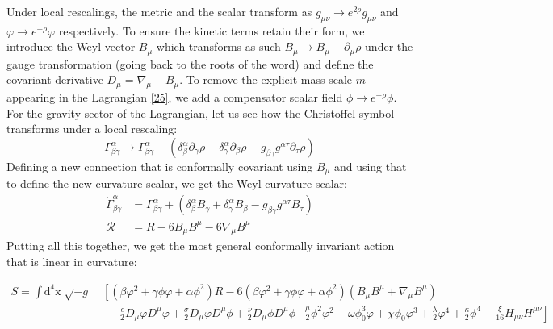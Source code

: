 \documentclass[aps,prd,reprint,preprintnumbers,showpacs,floatfix,nofootinbib,superscript address]{revtex4-2}
\begin{document}
Under local rescalings, the metric and the scalar transform as $g_{\mu\nu} \rightarrow e^{2\rho} g_{\mu\nu} $ and  $\varphi \rightarrow e^{-\rho}\varphi$ respectively. To ensure the kinetic terms retain their form, we introduce the Weyl vector $B_\mu$ which transforms as such $B_{\mu} \rightarrow B_\mu - \partial_\mu \rho$ under the gauge transformation (going back to the roots of the word) and define the covariant derivative $D_\mu = \nabla_\mu - B_\mu$. To remove the explicit mass scale $m$ appearing in the Lagrangian \ref{25}, we add a compensator scalar field $\phi \rightarrow e^{-\rho}\phi$. For the gravity sector of the Lagrangian, let us see how the Christoffel symbol transforms under a local rescaling:
\begin{equation}
    \Gamma^{\alpha}_{\beta \gamma} \rightarrow \Gamma^{\alpha}_{\beta \gamma} +(\delta^{\alpha}_{\beta} \partial_\gamma \rho + \delta^{\alpha}_{\gamma} \partial_{\beta} \rho - g_{\beta \gamma}g^{\alpha \tau}\partial_{\tau}\rho)
\end{equation}
Defining a new connection that is conformally covariant using $B_\mu$ and using that to define the new curvature scalar, we get the Weyl curvature scalar:
\begin{align}
    \mathring{\Gamma}^{\alpha}_{\beta \gamma} &= \Gamma^{\alpha}_{\beta \gamma} + (\delta^{\alpha}_{\beta} B_{\gamma} + \delta^{\alpha}_{\gamma} B_{\beta} - g_{\beta \gamma}g^{\alpha \tau}B_{\tau}) \nonumber \\
    \mathcal{R} &= R - 6 B_{\mu} B^{\mu} - 6 \nabla_\mu B^\mu
\end{align}
Putting all this together, we get the most general conformally invariant action that is linear in curvature:
\begin{widetext} 
\begin{subequations} \label{Starting Action}
\begin{align}
    S =\int \text{d}^4\text{x} \; \sqrt{-g} &\; \left[ ( \beta \varphi^2 + \gamma \phi \varphi +\alpha \phi^2) R - 6( \beta \varphi^2 + \gamma \phi \varphi +\alpha \phi^2) (B_{\mu} B^{\mu} + \nabla_\mu B^\mu) \right. \nonumber \\
    &\quad \left. +\frac{\epsilon}{2} D_{\mu}\varphi D^{\mu}\varphi + \frac{\sigma}{2} D_{\mu}\varphi D^{\mu}\phi + \frac{\nu}{2} D_{\mu}\phi D^{\mu}\phi \right. \left. - \frac{\mu}{2} \phi^2 \varphi^2 + \omega \phi_0^3 \varphi + \chi \phi_0 \varphi^3 + \frac{\lambda}{2} \varphi^4 + \frac{\kappa}{2} \phi^4 - \frac{\xi}{16} H_{\mu\nu}H^{\mu\nu} \right]  
\end{align}
\end{subequations}
\end{widetext}
\end{document}
